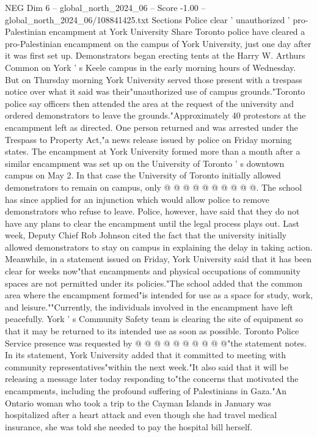 \begin{textsample}{NEG Dim 6 – global\_north\_2024\_06 – Score -1.00 – global\_north\_2024\_06/108841425.txt}  \label{ex:f6_neg_311}
Sections Police clear ' unauthorized ' pro-Palestinian encampment at York University Share Toronto police have cleared a pro-Palestinian encampment on the campus of York University, just one day after it was first set up.
Demonstrators began erecting tents at the Harry W.
Arthurs Common on York ' s Keele campus in the early morning hours of Wednesday.
But on Thursday morning York University served those present with a trespass notice over what it said was their"unauthorized use of campus grounds."Toronto police say officers then attended the area at the request of the university and ordered demonstrators to leave the grounds."Approximately 40 protestors at the encampment left as directed.
One person returned and was arrested under the Trespass to Property Act,"a news release issued by police on Friday morning states.
The encampment at York University formed more than a month after a similar encampment was set up on the University of Toronto ' s downtown campus on May 2.
In that case the University of Toronto initially allowed demonstrators to remain on campus, only @ @ @ @ @ @ @ @ @ @.
The school has since applied for an injunction which would allow police to remove demonstrators who refuse to leave.
Police, however, have said that they do not have any plans to clear the encampment until the legal process plays out.
Last week, Deputy Chief Rob Johnson cited the fact that the university initially allowed demonstrators to stay on campus in explaining the delay in taking action.
Meanwhile, in a statement issued on Friday, York University said that it has been clear for weeks now"that encampments and physical occupations of community spaces are not permitted under its policies."The school added that the common area where the encampment formed"is intended for use as a space for study, work, and leisure.""Currently, the individuals involved in the encampment have left peacefully.
York ' s Community Safety team is clearing the site of equipment so that it may be returned to its intended use as soon as possible.
Toronto Police Service presence was requested by @ @ @ @ @ @ @ @ @ @"the statement notes.
In its statement, York University added that it committed to meeting with community representatives"within the next week."It also said that it will be releasing a message later today responding to"the concerns that motivated the encampments, including the profound suffering of Palestinians in Gaza."An Ontario woman who took a trip to the Cayman Islands in January was hospitalized after a heart attack and even though she had travel medical insurance, she was told she needed to pay the hospital bill herself.

\end{textsample}
